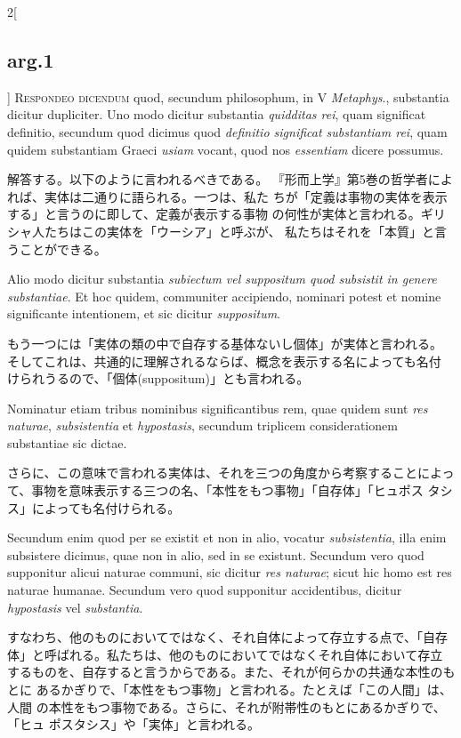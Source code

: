 \documentclass[paper=a4paper,fontsize=10pt,jafontsize=9pt,titlepage]{jlreq}
\begin{document}
\begin{paracol}{2}[\subsection{arg.1}]
{\scshape Respondeo dicendum} quod, secundum philosophum, in V {\itshape Metaphys}.,
substantia dicitur dupliciter. Uno modo dicitur substantia {\itshape quidditas
rei}, quam significat definitio, secundum quod dicimus quod {\itshape definitio
significat substantiam rei}, quam quidem substantiam Graeci {\itshape usiam} vocant,
quod nos {\itshape essentiam} dicere possumus.

\switchcolumn

解答する。以下のように言われるべきである。
『形而上学』第5巻の哲学者によれば、実体は二通りに語られる。一つは、私た
 ちが「定義は事物の実体を表示する」と言うのに即して、定義が表示する事物
 の何性が実体と言われる。ギリシャ人たちはこの実体を「ウーシア」と呼ぶが、
 私たちはそれを「本質」と言うことができる。

\switchcolumn*

Alio modo dicitur substantia
{\itshape subiectum vel suppositum quod subsistit in genere substantiae}. Et hoc
quidem, communiter accipiendo, nominari potest et nomine significante
intentionem, et sic dicitur {\itshape suppositum}.

\switchcolumn

もう一つには「実体の類の中で自存する基体ないし個体」が実体と言われる。
 そしてこれは、共通的に理解されるならば、概念を表示する名によっても名付
 けられうるので、「個体(suppositum)」とも言われる。

\switchcolumn*

Nominatur etiam tribus nominibus
significantibus rem, quae quidem sunt {\itshape res naturae}, {\itshape subsistentia} et
{\itshape hypostasis}, secundum triplicem considerationem substantiae sic
dictae.

\switchcolumn

さらに、この意味で言われる実体は、それを三つの角度から考察することによっ
 て、事物を意味表示する三つの名、「本性をもつ事物」「自存体」「ヒュポス
 タシス」によっても名付けられる。

\switchcolumn*

Secundum enim quod per se existit et non in alio, vocatur
{\itshape subsistentia}, illa enim subsistere dicimus, quae non in alio, sed in se
existunt.
Secundum vero quod supponitur alicui naturae communi, sic
dicitur {\itshape res naturae}; sicut hic homo est res naturae humanae. Secundum
vero quod supponitur accidentibus, dicitur {\itshape hypostasis} vel
{\itshape substantia}.

\switchcolumn

すなわち、他のものにおいてではなく、それ自体によって存立する点で、「自存
 体」と呼ばれる。私たちは、他のものにおいてではなくそれ自体において存立
 するものを、自存すると言うからである。また、それが何らかの共通な本性のもとに
 あるかぎりで、「本性をもつ事物」と言われる。たとえば「この人間」は、人間
 の本性をもつ事物である。さらに、それが附帯性のもとにあるかぎりで、「ヒュ
 ポスタシス」や「実体」と言われる。


\end{paracol}
\end{document}
